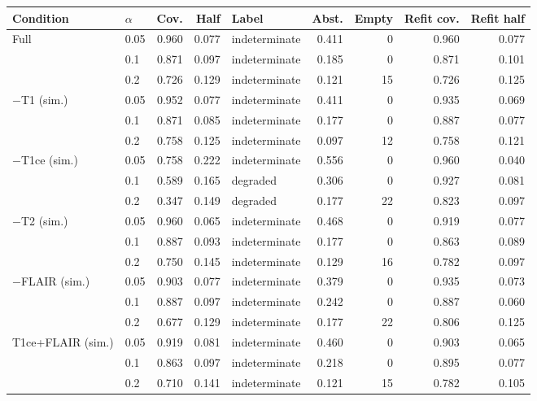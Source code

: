 \begin{tabular}{llrrlrrrr}
\toprule
Condition & $\alpha$ & Cov. & Half & Label & Abst. & Empty & Refit cov. & Refit half \\
\midrule
Full & 0.05 & 0.960 & 0.077 & indeterminate & 0.411 & 0 & 0.960 & 0.077 \\
 & 0.1 & 0.871 & 0.097 & indeterminate & 0.185 & 0 & 0.871 & 0.101 \\
 & 0.2 & 0.726 & 0.129 & indeterminate & 0.121 & 15 & 0.726 & 0.125 \\
$-$T1 (sim.) & 0.05 & 0.952 & 0.077 & indeterminate & 0.411 & 0 & 0.935 & 0.069 \\
 & 0.1 & 0.871 & 0.085 & indeterminate & 0.177 & 0 & 0.887 & 0.077 \\
 & 0.2 & 0.758 & 0.125 & indeterminate & 0.097 & 12 & 0.758 & 0.121 \\
$-$T1ce (sim.) & 0.05 & 0.758 & 0.222 & indeterminate & 0.556 & 0 & 0.960 & 0.040 \\
 & 0.1 & 0.589 & 0.165 & degraded & 0.306 & 0 & 0.927 & 0.081 \\
 & 0.2 & 0.347 & 0.149 & degraded & 0.177 & 22 & 0.823 & 0.097 \\
$-$T2 (sim.) & 0.05 & 0.960 & 0.065 & indeterminate & 0.468 & 0 & 0.919 & 0.077 \\
 & 0.1 & 0.887 & 0.093 & indeterminate & 0.177 & 0 & 0.863 & 0.089 \\
 & 0.2 & 0.750 & 0.145 & indeterminate & 0.129 & 16 & 0.782 & 0.097 \\
$-$FLAIR (sim.) & 0.05 & 0.903 & 0.077 & indeterminate & 0.379 & 0 & 0.935 & 0.073 \\
 & 0.1 & 0.887 & 0.097 & indeterminate & 0.242 & 0 & 0.887 & 0.060 \\
 & 0.2 & 0.677 & 0.129 & indeterminate & 0.177 & 22 & 0.806 & 0.125 \\
T1ce+FLAIR (sim.) & 0.05 & 0.919 & 0.081 & indeterminate & 0.460 & 0 & 0.903 & 0.065 \\
 & 0.1 & 0.863 & 0.097 & indeterminate & 0.218 & 0 & 0.895 & 0.077 \\
 & 0.2 & 0.710 & 0.141 & indeterminate & 0.121 & 15 & 0.782 & 0.105 \\
\bottomrule
\end{tabular}
